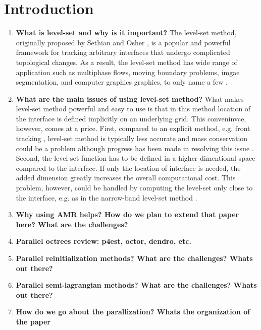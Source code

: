 \section{Introduction}
\begin{enumerate}
\item \textbf{What is level-set and why is it important?}
The level-set method, originally proposed by Sethian and Osher , is a popular and powerful framework for tracking arbitrary interfaces that undergo complicated topological changes. As a result, the level-set method has wide range of application such as multiphase flows, moving boundary problems, imgae segmentation, and computer graphics graphics, to only name a few .

\item \textbf{What are the main issues of using level-set method?}
What makes level-set method powerful and easy to use is that in this method location of the interface is defined implicitly on an underlying grid. This conveninvce, however, comes at a price. First, compared to an explicit method, e.g. front tracking , level-set method is typically less accurate and mass conservation could be a problem although progress has been made in resolving this issue . Second, the level-set function has to be defined in a higher dimentional space compared to the interface. If only the location of interface is needed, the added dimension greatly increases the overall computational cost. This problem, however, could be handled by computing the level-set only close to the interface, e.g. as in the narrow-band level-set method .

\item \textbf{Why using AMR helps? How do we plan to extend that paper here? What are the challenges?}

\item \textbf{Parallel octrees review: p4est, octor, dendro, etc.}

\item \textbf{Parallel reinitialization methods? What are the challenges? Whats out there?}

\item \textbf{Parallel semi-lagrangian methods? What are the challenges? Whats out there?}

\item \textbf{How do we go about the parallization? Whats the organization of the paper}
\end{enumerate}